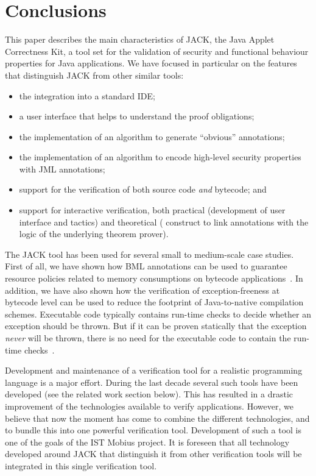 
\section{Conclusions}\label{SecConcl}

This paper describes the main characteristics of JACK, the Java Applet
Correctness Kit, a tool set for the validation of security and
functional behaviour properties for Java applications. We have focused
in particular on the features that distinguish JACK from other similar
tools:
\begin{itemize}
\item the integration into a standard IDE;
\item a user interface that helps to understand the proof obligations;
\item the implementation of an algorithm to generate
``obvious'' annotations;
\item the implementation of an algorithm to encode high-level security
properties with JML annotations; 
\item support for the verification of both source code \emph{and}
bytecode; and
\item support for interactive verification, both practical
(development of user interface and tactics) and theoretical (\native
construct to link annotations with the logic of the
underlying theorem prover).
\end{itemize}

The JACK tool has been used for several small to medium-scale case
studies. First of all, we have shown how BML annotations can be used
to guarantee resource policies related to memory consumptions on
bytecode applications~\cite{BarthePS05}. In addition, we have also
shown how the verification of exception-freeness at bytecode level can
be used to reduce the footprint of Java-to-native compilation
schemes. Executable code typically contains run-time checks to decide
whether an exception should be thrown. But if it can be proven statically
that the exception \emph{never} will be thrown, there is no need for
the executable code to contain the run-time
checks~\cite{DBLP:conf/cardis/CourbotPGV06}.


Development and maintenance of a verification tool for a realistic
programming language is a major effort. During the last decade several
such tools have been developed (see the related work section
below). This has resulted in a drastic improvement of the technologies
available to verify applications. However, we believe that now the
moment has come to combine the different technologies, and to bundle
this into one powerful verification tool. Development of such a tool
is one of the goals of the IST \textsf{Mobius} project. It is foreseen
that all technology developed around JACK that distinguish it from
other verification tools will be integrated in this single
verification tool.

